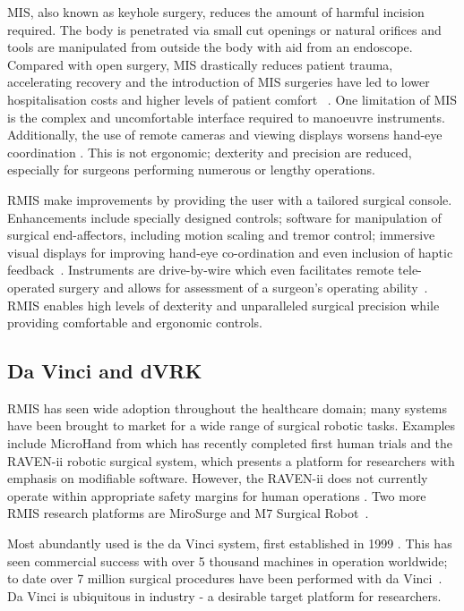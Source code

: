\documentclass[english]{sobraep}
\begin{document}
\par{MIS, also known as keyhole surgery, reduces the amount of harmful incision required. The body is penetrated via small cut openings or natural orifices and tools are  manipulated from outside the  body with aid from an endoscope. Compared with open surgery, MIS drastically reduces patient trauma, accelerating recovery and the introduction of MIS surgeries have led to lower hospitalisation costs and higher levels of patient comfort ~\cite{laparoscopic-vs-open,intro-rmis}. One limitation of MIS is the complex and uncomfortable interface required to manoeuvre instruments. Additionally, the use of remote cameras and viewing displays worsens hand-eye coordination \cite{intro-rmis, force-sensing}. This is not ergonomic; dexterity and precision are reduced, especially for surgeons performing numerous or lengthy operations.}

\par{RMIS make improvements by providing the user with a tailored surgical console. Enhancements include specially designed controls; software for manipulation of surgical end-affectors, including motion scaling and tremor control; immersive visual displays for improving hand-eye co-ordination and even inclusion of haptic feedback~\cite{intro-rmis}. Instruments are drive-by-wire which even facilitates remote tele-operated surgery and allows for assessment of a  surgeon's operating ability~\cite{ergonomics}. RMIS enables high levels of dexterity and unparalleled surgical precision while providing comfortable and ergonomic controls.} 

\subsection{Da Vinci and dVRK}
\par{RMIS has seen wide adoption throughout the healthcare domain; many systems have been brought to market for a wide range of surgical robotic tasks. Examples include MicroHand from \citeauthor{microhand2} which has recently completed first human trials \cite{microhand2} and the RAVEN-ii robotic surgical system, which presents a platform for researchers with emphasis on modifiable software. However, the RAVEN-ii does not currently operate within appropriate safety margins for human operations \cite{raven-ii}. Two more RMIS research platforms are MiroSurge and M7 Surgical Robot~\cite[Table 1]{other-rmis-machines}.}

\par{Most abundantly used is the da Vinci system, first established in 1999 \cite{ergonomics, 10-years-dvrk}. This has seen commercial success with over 5 thousand machines in operation worldwide; to date over 7 million surgical procedures have been performed with da Vinci~\cite{10-years-dvrk}. Da Vinci is ubiquitous in industry - a desirable target platform for researchers.}
\end{document}
